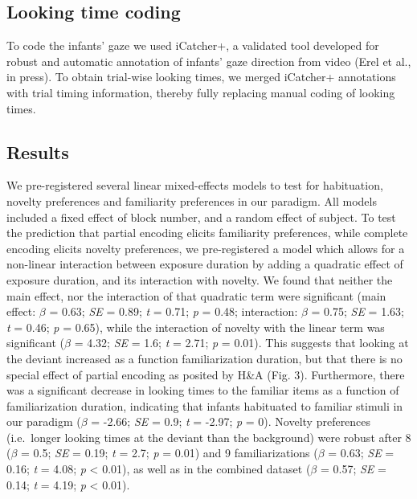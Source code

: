 \documentclass[10pt, letterpaper]{article}
\begin{document}
\hypertarget{looking-time-coding}{%
\subsection{Looking time coding}\label{looking-time-coding}}

To code the infants' gaze we used iCatcher+, a validated tool developed
for robust and automatic annotation of infants' gaze direction from
video (Erel et al., in press). To obtain trial-wise looking times, we
merged iCatcher+ annotations with trial timing information, thereby
fully replacing manual coding of looking times.

\hypertarget{results-1}{%
\subsection{Results}\label{results-1}}

We pre-registered several linear mixed-effects models to test for
habituation, novelty preferences and familiarity preferences in our
paradigm. All models included a fixed effect of block number, and a
random effect of subject. To test the prediction that partial encoding
elicits familiarity preferences, while complete encoding elicits novelty
preferences, we pre-registered a model which allows for a non-linear
interaction between exposure duration by adding a quadratic effect of
exposure duration, and its interaction with novelty. We found that
neither the main effect, nor the interaction of that quadratic term were
significant (main effect: \(\beta\) = 0.63; \emph{SE} = 0.89; \emph{t} =
0.71; \emph{p} = 0.48; interaction: \(\beta\) = 0.75; \emph{SE} = 1.63;
\emph{t} = 0.46; \emph{p} = 0.65), while the interaction of novelty with
the linear term was significant (\(\beta\) = 4.32; \emph{SE} = 1.6;
\emph{t} = 2.71; \emph{p} = 0.01). This suggests that looking at the
deviant increased as a function familiarization duration, but that there
is no special effect of partial encoding as posited by H\&A (Fig. 3).
Furthermore, there was a significant decrease in looking times to the
familiar items as a function of familiarization duration, indicating
that infants habituated to familiar stimuli in our paradigm (\(\beta\) =
-2.66; \emph{SE} = 0.9; \emph{t} = -2.97; \emph{p} = 0). Novelty
preferences (i.e.~longer looking times at the deviant than the
background) were robust after 8 (\(\beta\) = 0.5; \emph{SE} = 0.19;
\emph{t} = 2.7; \emph{p} = 0.01) and 9 familiarizations (\(\beta\) =
0.63; \emph{SE} = 0.16; \emph{t} = 4.08; \emph{p} \textless{} 0.01), as
well as in the combined dataset (\(\beta\) = 0.57; \emph{SE} = 0.14;
\emph{t} = 4.19; \emph{p} \textless{} 0.01).
\end{document}
